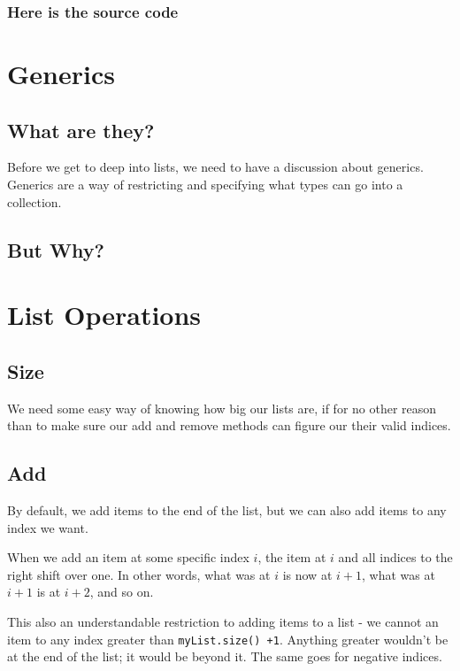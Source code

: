 \subsubsection*{Here is the source code}



\section{Generics}

\subsection{What are they?}


Before we get to deep into lists, we need to have a discussion about generics. Generics are a way of restricting and specifying what types can go into a collection.

\subsection{But Why?}




\section{List Operations}


\subsection{Size} We need some easy way of knowing how big our lists are, if for no other reason than to make sure our  add and remove methods can figure our their valid indices.


\subsection{Add}  By default, we add items to the end of the list, but we can also add items to any index we want.

When we add an item at some specific index $ i $, the item at $ i $ and all indices to the right shift over one.  In other words, what was at $ i $ is now at $ i+1 $, what was at $ i+1 $ is at $ i+2 $,  and so on.

This also an understandable restriction to adding items to a list -  we cannot an item to any index greater than \texttt{myList.size() +1}.   Anything greater wouldn't be at the end of the list; it would be beyond it.  The same goes for negative indices.
 
